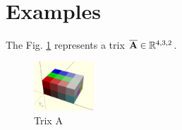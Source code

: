 \documentclass[11pt]{article}
\newcommand{\TRIX}[1]{\mathbf{\overline{\uppercase{#1}}}}
\newcommand{\dimsep}{,}
\begin{document}
\newpage\
\section{Examples}
The Fig. \ref{fig:trix1} represents a trix $\TRIX{A}\in \mathbb{R}^{4\dimsep 3\dimsep 2}$.
\begin{figure}[h]
  \centering
    \includegraphics[width=0.2\textwidth]{array3d}
    \caption{Trix A}
    \label{fig:trix1}
\end{figure}
\end{document}
